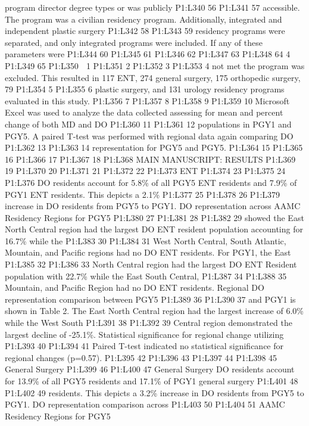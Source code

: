 program director degree types or was publicly P1:L340 56 P1:L341 57
accessible. The program was a civilian residency program. Additionally,
integrated and independent plastic surgery P1:L342 58 P1:L343 59
residency programs were separated, and only integrated programs were
included. If any of these parameters were P1:L344 60 P1:L345 61 P1:L346
62 P1:L347 63 P1:L348 64 4 P1:L349 65 P1:L350  1 P1:L351 2 P1:L352 3
P1:L353 4 not met the program was excluded. This resulted in 117 ENT,
274 general surgery, 175 orthopedic surgery, 79 P1:L354 5 P1:L355 6
plastic surgery, and 131 urology residency programs evaluated in this
study. P1:L356 7 P1:L357 8 P1:L358 9 P1:L359 10 Microsoft Excel was used
to analyze the data collected assessing for mean and percent change of
both MD and DO P1:L360 11 P1:L361 12 populations in PGY1 and PGY5. A
paired T-test was performed with regional data again comparing DO
P1:L362 13 P1:L363 14 representation for PGY5 and PGY5. P1:L364 15
P1:L365 16 P1:L366 17 P1:L367 18 P1:L368 MAIN MANUSCRIPT: RESULTS
P1:L369 19 P1:L370 20 P1:L371 21 P1:L372 22 P1:L373 ENT P1:L374 23
P1:L375 24 P1:L376 DO residents account for 5.8\% of all PGY5 ENT
residents and 7.9\% of PGY1 ENT residents. This depicts a 2.1\% P1:L377
25 P1:L378 26 P1:L379 increase in DO residents from PGY5 to PGY1. DO
representation across AAMC Residency Regions for PGY5 P1:L380 27 P1:L381
28 P1:L382 29 showed the East North Central region had the largest DO
ENT resident population accounting for 16.7\% while the P1:L383 30
P1:L384 31 West North Central, South Atlantic, Mountain, and Pacific
regions had no DO ENT residents. For PGY1, the East P1:L385 32 P1:L386
33 North Central region had the largest DO ENT Resident population with
22.7\% while the East South Central, P1:L387 34 P1:L388 35 Mountain, and
Pacific Region had no DO ENT residents. Regional DO representation
comparison between PGY5 P1:L389 36 P1:L390 37 and PGY1 is shown in Table
2. The East North Central region had the largest increase of 6.0\% while
the West South P1:L391 38 P1:L392 39 Central region demonstrated the
largest decline of -25.1\%. Statistical significance for regional change
utilizing P1:L393 40 P1:L394 41 Paired T-test indicated no statistical
significance for regional changes (p=0.57). P1:L395 42 P1:L396 43
P1:L397 44 P1:L398 45 General Surgery P1:L399 46 P1:L400 47 General
Surgery DO residents account for 13.9\% of all PGY5 residents and 17.1\%
of PGY1 general surgery P1:L401 48 P1:L402 49 residents. This depicts a
3.2\% increase in DO residents from PGY5 to PGY1. DO representation
comparison across P1:L403 50 P1:L404 51 AAMC Residency Regions for PGY5
